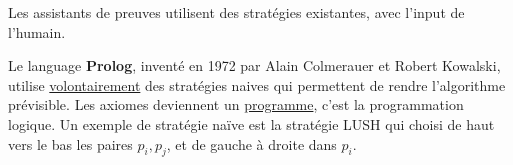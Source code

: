 Les assistants de preuves utilisent des stratégies existantes, avec l'input de l'humain.

Le language \textbf{Prolog}, inventé en 1972 par Alain Colmerauer et Robert Kowalski, utilise \underline{volontairement} des stratégies naives qui permettent de rendre l'algorithme prévisible. Les axiomes deviennent un \underline{programme}, c'est la programmation logique. Un exemple de stratégie naïve est la stratégie LUSH qui choisi de haut vers le bas les paires $p_i, p_j$, et de gauche à droite dans $p_i$.
